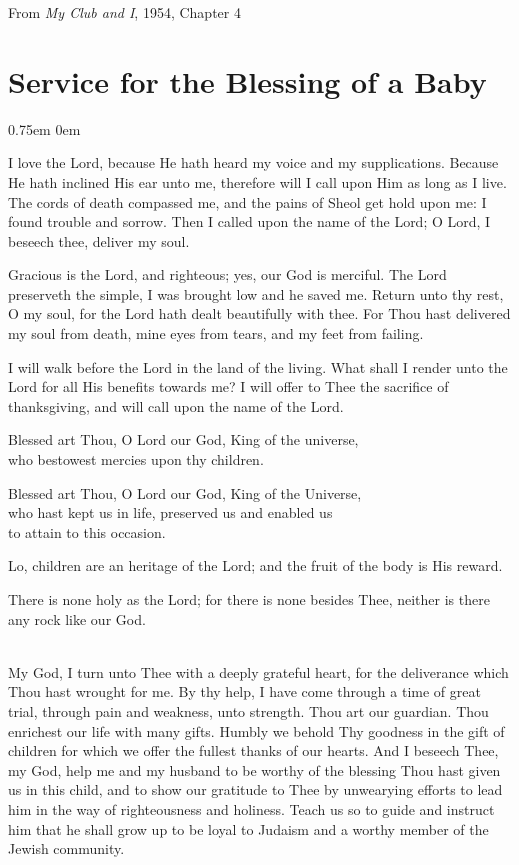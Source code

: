 \documentclass[14pt, article, extrafontsizes, twopage, a4paper]{memoir}
\newcommand{\attr}[1]{
  {\raggedleft\smaller#1

  }
}
\begin{document}
\attr{From \textsl{My Club and I}, 1954, Chapter 4}


\pagebreak
\chapter{Service for the Blessing of a Baby}
\parskip 0.75em
\parindent 0em

{\larger

I love the Lord, because He hath heard my voice and my supplications.
Because He hath inclined His ear unto me,
therefore will I call upon Him as long as I live.
The cords of death compassed me,
and the pains of Sheol get hold upon me:
I found trouble and sorrow.
Then I called upon the name of the Lord;
O Lord, I beseech thee, deliver my soul.

Gracious is the Lord, and righteous;
yes, our God is merciful.
The Lord preserveth the simple,
I was brought low and he saved me.
Return unto thy rest, O my soul,
for the Lord hath dealt beautifully with thee.
For Thou hast delivered my soul from death,
mine eyes from tears,
and my feet from failing.

I will walk before the Lord in the land of the living.
What shall I render unto the Lord for all His benefits towards me?
I will offer to Thee the sacrifice of thanksgiving,
and will call upon the name of the Lord.

Blessed art Thou,
O Lord our God,
King of the universe,\\
who bestowest mercies upon thy children.

Blessed art Thou,
O Lord our God,
King of the Universe,\\
who hast kept us in life,
preserved us and enabled us\\
to attain to this occasion.


Lo, children are an heritage of the Lord;
and the fruit of the body is His reward.

There is none holy as the Lord;
for there is none besides Thee,
neither is there any rock like our God.

\clearpage
{}\\
My God,
I turn unto Thee with a deeply grateful heart,
for the deliverance which Thou hast wrought for me.
By thy help,
I have come through a time of great trial,
through pain and weakness, unto strength.
Thou art our guardian.
Thou enrichest our life with many gifts.
Humbly we behold Thy goodness in the gift of children
for which we offer the fullest thanks of our hearts.
And I beseech Thee, my God,
help me and my husband
to be worthy of the blessing
Thou hast given us in this child,
and to show our gratitude to Thee
by unwearying efforts to lead him
in the way of righteousness and holiness.
Teach us so to guide and instruct him
that he shall grow up to be loyal to Judaism
and a worthy member of the Jewish community.

}
\end{document}
